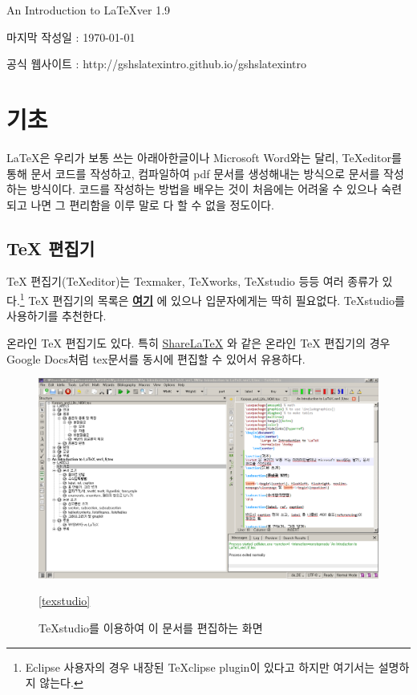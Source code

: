 \documentclass[11pt]{article}
\begin{document}
	\begin{center}
		\Large An Introduction to \LaTeX ver 1.9
		
		\normalsize 마지막 작성일 :  \today
		
		공식 웹사이트 : http://gshslatexintro.github.io/gshslatexintro
	\end{center}
\section{기초}
\LaTeX 은 우리가 보통 쓰는 아래아한글이나 Microsoft Word와는 달리, TeXeditor를 통해 문서 코드를 작성하고, 컴파일하여 pdf 문서를 생성해내는 방식으로 문서를 작성하는 방식이다. 코드를 작성하는 방법을 배우는 것이 처음에는 어려울 수 있으나 숙련되고 나면 그 편리함을 이루 말로 다 할 수 없을 정도이다.

\subsection{TeX 편집기}
TeX 편집기(TeXeditor)는 Texmaker, TeXworks, TeXstudio 등등 여러 종류가 있다.\footnote{Eclipse 사용자의 경우 내장된 TeXclipse plugin이 있다고 하지만 여기서는 설명하지 않는다.} TeX 편집기의 목록은 \href{https://en.wikipedia.org/wiki/Comparison_of_TeX_editors}{\textbf{여기}} 에 있으나 입문자에게는 딱히 필요없다. TeXstudio를 사용하기를 추천한다. 

온라인 TeX 편집기도 있다. 특히 \href{https://www.sharelatex.com/}{ShareLaTeX} 와 같은 온라인 TeX 편집기의 경우 Google Docs처럼 tex문서를 동시에 편집할 수 있어서 유용하다.

\begin{figure}
	\begin{center}
		\includegraphics{texstudio.png}
	\end{center}
	\caption{TeXstudio를 이용하여 이 문서를 편집하는 화면}
	\ref{texstudio}
\end{figure}
\end{document}
